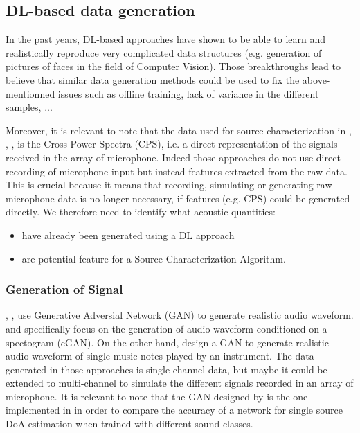 \documentclass{article}
\begin{document}
\subsection{DL-based data generation}

In the past years, DL-based approaches have shown to be able to learn and realistically reproduce very complicated data structures (e.g. generation of pictures of faces in the field of Computer Vision). Those breakthroughs lead to believe that similar data generation methods could be used to fix the above-mentionned issues such as offline training, lack of variance in the different samples, ...

Moreover, it is relevant to note that the data used for source characterization in \cite{castellini2021neural}, \cite{lee2021deep}, \cite{ma2019phased}, \cite{xu2021deep} is the Cross Power Spectra (CPS), i.e. a direct representation of the signals received in the array of microphone. Indeed those approaches do not use direct recording of microphone input but instead features extracted from the raw data. This is crucial because it means that recording, simulating or generating raw microphone data is no longer necessary, if features (e.g. CPS) could be generated directly. We therefore need to identify what acoustic quantities:
\begin{itemize}
    \item have already been generated using a DL approach
    \item are potential feature for a Source Characterization Algorithm.
\end{itemize}


\subsubsection{Generation of Signal}

\cite{neekhara2019expediting}, \cite{NEURIPS2019_6804c9bc}, \cite{engel2019gansynth} use Generative Adversial Network (GAN) to generate realistic audio waveform. \cite{neekhara2019expediting} and \cite{NEURIPS2019_6804c9bc} specifically focus on the generation of audio waveform conditioned on a spectogram (cGAN). On the other hand, \cite{engel2019gansynth} design a GAN to generate realistic audio waveform of single music notes played by an instrument. The data generated in those approaches is single-channel data, but maybe it could be extended to multi-channel to simulate the different signals recorded in an array of microphone. It is relevant to note that the GAN designed by \cite{neekhara2019expediting} is the one implemented in \cite{vargas2021improved} in order to compare the accuracy of a network for single source DoA estimation when trained with different sound classes.
\end{document}
